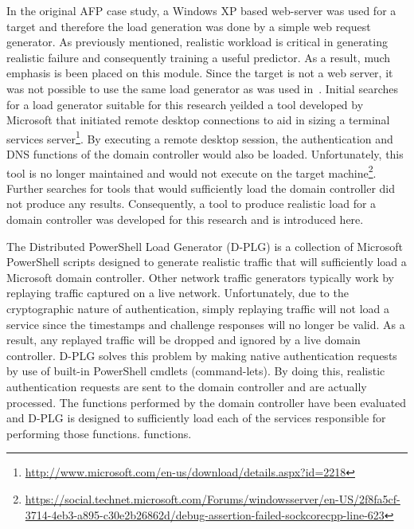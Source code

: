 In the original AFP case study, a Windows XP based web-server was used for a
target and therefore the load generation was done by a simple web request
generator.  As previously mentioned, realistic workload is critical in
generating realistic failure and consequently training a useful predictor.  As
a result, much emphasis is been placed on this module.  Since the target is
not a web server, it was not possible to use the same load generator as was
used in~\cite{irrera2015}.  Initial searches for a load generator suitable for
this research yeilded a tool developed by Microsoft that initiated remote
desktop connections to aid in sizing a terminal services
server\footnote{\url{http://www.microsoft.com/en-us/download/details.aspx?id=2218}}.
By executing a remote desktop session, the authentication and DNS functions of
the domain controller would also be loaded.  Unfortunately, this tool is no
longer maintained and would not execute on the target
machine\footnote{\url{https://social.technet.microsoft.com/Forums/windowsserver/en-US/2f8fa5cf-3714-4eb3-a895-c30e2b26862d/debug-assertion-failed-sockcorecpp-line-623}}.
Further searches for tools that would sufficiently load the domain controller
did not produce any results.  Consequently, a tool to produce realistic load
for a domain controller was developed for this research and is introduced here.


The Distributed PowerShell Load Generator (D-PLG) is a collection of Microsoft
PowerShell scripts designed to generate realistic traffic that will
sufficiently load a Microsoft domain controller.  Other network traffic
generators typically work by replaying traffic captured on a live network.
Unfortunately, due to the cryptographic nature of authentication, simply
replaying traffic will not load a service since the timestamps and challenge
responses will no longer be valid.  As a result, any replayed traffic will be
dropped and ignored by a live domain controller.  D-PLG solves this problem by
making native authentication requests by use of built-in PowerShell cmdlets
(command-lets).  By doing this, realistic authentication requests are sent to
the domain controller and are actually processed.  The functions performed by
the domain controller have been evaluated and D-PLG is designed to sufficiently
load each of the services responsible for performing those functions.
functions.

